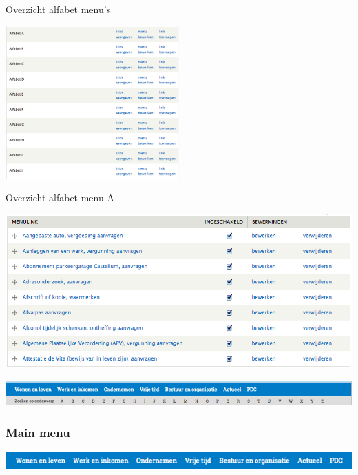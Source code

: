 \bigskip

Overzicht alfabet menu's

\begin{center}
\includegraphics[width=0.5\textwidth]{img/menus_alfabet.png}
\end{center}

Overzicht alfabet menu A

\begin{center}
\includegraphics[width=\textwidth]{img/menu_alfabet_a.png}
\end{center}

\begin{center}
\includegraphics[width=\textwidth]{img/menu3.png}
\end{center}

\bigskip

\subsubsection{Main menu}\label{mainmenu}

\begin{center}
	\includegraphics[width=\textwidth]{img/menu_main.png}
\end{center}

